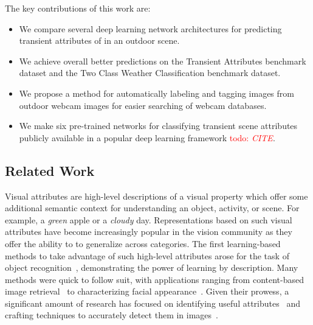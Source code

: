 \documentclass{article}
\newcommand{\todo}[1]{\textcolor{red}{todo: {\em #1}}}
\begin{document}
The key contributions of this work are:
\begin{itemize}

  \item We compare several deep learning network architectures for
    		predicting transient attributes of in an outdoor scene.

	\item We achieve overall better predictions on the Transient Attributes
				benchmark dataset and the Two Class Weather Classification 
				benchmark dataset.

	\item We propose a method for automatically labeling and tagging images
				from outdoor webcam images for easier searching of webcam databases.

      \item We make six pre-trained networks for classifying transient
        scene attributes publicly available in a popular deep learning
        framework \todo{CITE}.



\end{itemize}

\subsection{Related Work}

Visual attributes are high-level descriptions of a visual property
which offer some additional semantic context for understanding an
object, activity, or scene. For example, a \emph{green} apple or a
\emph{cloudy} day. Representations based on such visual attributes
have become increasingly popular in the vision community as they offer
the ability to to generalize across categories. The first
learning-based methods to take advantage of such high-level attributes
arose for the task of object
recognition~\cite{farhadi2009describing,lampert2009learning},
demonstrating the power of learning by description. Many methods were
quick to follow suit, with applications ranging from content-based
image retrieval~\cite{siddiquie2011image} to characterizing facial
appearance~\cite{kumar2011describable}. Given their prowess, a
significant amount of research has focused on identifying useful
attributes~\cite{berg2010automatic} and crafting techniques to
accurately detect them in images~\cite{vedaldi2014understanding}. 
\end{document}
